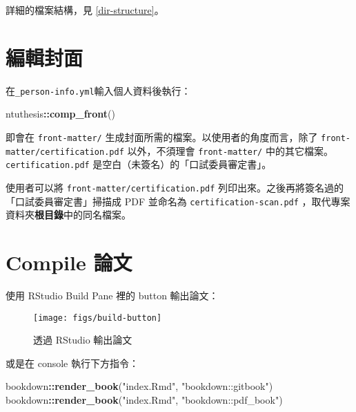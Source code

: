 \documentclass[oneside]{book}
\newenvironment{Shaded}{\begin{snugshade}}{\end{snugshade}}
\newcommand{\KeywordTok}[1]{\textcolor[rgb]{0.13,0.29,0.53}{\textbf{#1}}}
\newcommand{\NormalTok}[1]{#1}
\newcommand{\OperatorTok}[1]{\textcolor[rgb]{0.81,0.36,0.00}{\textbf{#1}}}
\newcommand{\StringTok}[1]{\textcolor[rgb]{0.31,0.60,0.02}{#1}}
\theoremstyle{definition}
\theoremstyle{definition}
\theoremstyle{definition}
\theoremstyle{remark}
\begin{document}
詳細的檔案結構，見 \ref{dir-structure}。

\hypertarget{edit-front-matter}{%
\section{編輯封面}\label{edit-front-matter}}

在\texttt{\_person-info.yml}輸入個人資料後執行：

\begin{Shaded}
\begin{Highlighting}[]
\NormalTok{ntuthesis}\OperatorTok{::}\KeywordTok{comp_front}\NormalTok{()}
\end{Highlighting}
\end{Shaded}

即會在 \texttt{front-matter/} 生成封面所需的檔案。以使用者的角度而言，除了 \texttt{front-matter/certification.pdf} 以外，不須理會 \texttt{front-matter/} 中的其它檔案。\texttt{certification.pdf} 是空白（未簽名）的「口試委員審定書」。

使用者可以將 \texttt{front-matter/certification.pdf} 列印出來。之後再將簽名過的「口試委員審定書」掃描成 PDF 並命名為 \texttt{certification-scan.pdf} ，取代專案資料夾\textbf{根目錄}中的同名檔案。

\hypertarget{compile-thesis}{%
\section{Compile 論文}\label{compile-thesis}}

使用 RStudio Build Pane 裡的 button 輸出論文：

\begin{figure}

{\centering \texttt{[image: figs/build-button]} 

}

\caption{透過 RStudio 輸出論文}\label{fig:unnamed-chunk-2}
\end{figure}

或是在 console 執行下方指令：

\begin{Shaded}
\begin{Highlighting}[]
\NormalTok{bookdown}\OperatorTok{::}\KeywordTok{render_book}\NormalTok{(}\StringTok{"index.Rmd"}\NormalTok{, }\StringTok{"bookdown::gitbook"}\NormalTok{)}
\NormalTok{bookdown}\OperatorTok{::}\KeywordTok{render_book}\NormalTok{(}\StringTok{"index.Rmd"}\NormalTok{, }\StringTok{"bookdown::pdf_book"}\NormalTok{)}
\end{Highlighting}
\end{Shaded}
\end{document}
